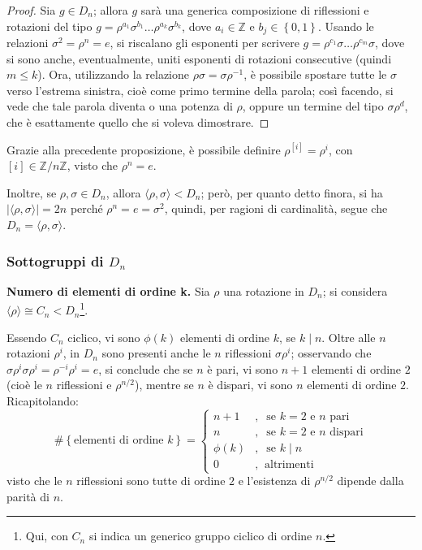 \documentclass[12pt]{scrartcl}
\theoremstyle{style}
\numberwithin{equation}{subsection}
\begin{document}
	\begin{proof}
	Sia $g \in D_n$; allora $g$ sar\`a una generica composizione di riflessioni e rotazioni del tipo $g= \rho ^{a_1} \sigma ^{b_1} \ldots \rho ^{a_k} \sigma ^{b_k} $, dove $a_i \in \mathbb{Z}$ e $b_j \in \left\{ 0,1 \right\} $. 
	Usando le relazioni $\sigma ^2 = \rho ^n = e$, si riscalano gli esponenti per scrivere $g = \rho ^{c_1} \sigma \ldots \rho ^{c_m} \sigma $, dove si sono anche, eventualmente, uniti esponenti di rotazioni consecutive (quindi $m\le k$).
	Ora, utilizzando la relazione $\rho \sigma =\sigma \rho ^{-1}$, \`e possibile spostare tutte le $\sigma$ verso l'estrema sinistra, cio\`e come primo termine della parola; cos\`i facendo, si vede che tale parola diventa o una potenza di $\rho $, oppure un termine del tipo $\sigma \rho ^d$, che \`e esattamente quello che si voleva dimostrare.
			\end{proof}
\noindent Grazie alla precedente proposizione, \`e possibile definire $\rho ^{[i]} = \rho ^i$, con $[i] \in \mathbb{Z} / n\mathbb{Z}$, visto che $\rho ^n = e$.

Inoltre, se $\rho ,\sigma  \in D_n$, allora $\langle \rho ,\sigma  \rangle< D_n$; per\`o, per quanto detto finora, si ha $\lvert \langle \rho ,\sigma  \rangle \rvert = 2n$ perch\'e $\rho ^n = e= \sigma ^2 $, quindi, per ragioni di cardinalit\`a, segue che $D_n = \langle \rho ,\sigma  \rangle$.

\subsubsection{Sottogruppi di $D_n$}
\hfill

\textbf{Numero di elementi di ordine k.} 
Sia $\rho $ una rotazione in $D_n$; si considera $\langle \rho  \rangle\cong C_n < D_n$\footnote{Qui, con $C_n$ si indica un generico gruppo ciclico di ordine $n$.}.

Essendo $C_n$ ciclico, vi sono $\phi (k)$ elementi di ordine $k$, se $k  \mid  n$.
Oltre alle $n$ rotazioni $\rho ^i$, in $D_n$ sono presenti anche le $n$ riflessioni $\sigma \rho ^i$; osservando che $\sigma \rho ^i \sigma \rho ^i = \rho ^{-i}\rho ^{i} = e $, si conclude che se $n$ \`e pari, vi sono $n+1$ elementi di ordine $2$ (cio\`e le $n$ riflessioni e $\rho ^{n / 2} $), mentre se $n$ \`e dispari, vi sono $n$ elementi di ordine $2$.
Ricapitolando:
\begin{equation}
\# \left\{ \text{elementi di ordine } k \right\} = \begin{cases}
	n + 1 &,\ \text{ se } k=2 \text{ e } n \text{ pari}\\
	n  &,\  \text{ se }k=2 \text{ e } n \text{ dispari}\\
	\phi (k)&,\ \text{ se } k \mid n\\
	0 &,\ \text{ altrimenti }
\end{cases}
\end{equation}
visto che le $n$ riflessioni sono tutte di ordine $2$ e l'esistenza di $\rho ^{n / 2} $ dipende dalla parit\`a di $n$.
\vspace*{5pt}
\end{document}
